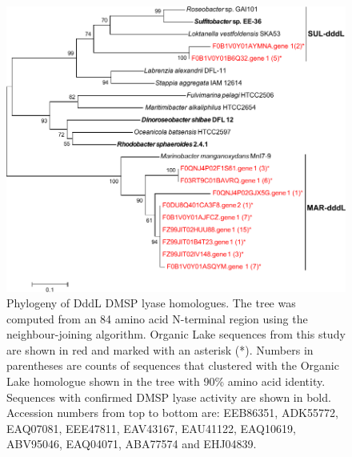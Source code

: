 \begin{figure}
\includegraphics[width=\textwidth]{orglake_figures/dddL_tree.pdf}
\caption[Phylogeny of DddL DMSP lyase homologues]{Phylogeny of DddL DMSP lyase homologues. The tree was computed from an 84 amino acid N-terminal region using the neighbour-joining algorithm. Organic Lake sequences from this study are shown in red and marked with an asterisk (*). Numbers in parentheses are counts of sequences that clustered with the Organic Lake homologue shown in the tree with 90\% amino acid identity. Sequences with confirmed DMSP lyase activity are shown in bold. Accession numbers from top to bottom are: EEB86351, ADK55772, EAQ07081, EEE47811, EAV43167, EAU41122, EAQ10619, ABV95046, EAQ04071, ABA77574 and EHJ04839.}
\label{fig:dddL_tree}

\end{figure}
